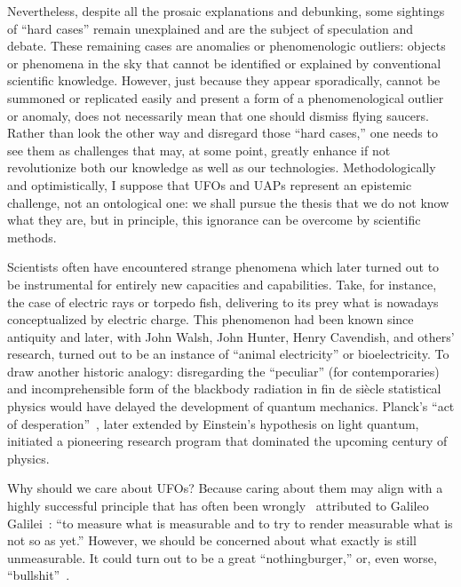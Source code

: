 Nevertheless, despite all the prosaic explanations and debunking, some sightings of ``hard cases''
remain unexplained and are the subject of speculation and debate.
These remaining cases are anomalies or phenomenologic outliers:
objects or phenomena in the sky that cannot be identified or explained by conventional scientific knowledge.
However,
just because they appear sporadically,
cannot be summoned or replicated easily and present a form of a phenomenological outlier or anomaly,
does not necessarily mean that one should dismiss flying saucers.
Rather than look the other way and disregard those ``hard cases,'' one needs to see them as challenges that may,
at some point, greatly enhance if not revolutionize both our knowledge as well as our technologies.
Methodologically and optimistically, I suppose that UFOs and UAPs represent an epistemic challenge,
not an ontological one: we shall pursue the thesis that we do not know what they are,
but in principle, this ignorance can be overcome by scientific methods.


Scientists often have encountered strange phenomena which later turned out to be instrumental
for entirely new capacities and capabilities.
Take, for instance, the case of electric rays or torpedo fish,
delivering to its prey what is nowadays conceptualized by electric charge.
This phenomenon had been known since antiquity and later, with John Walsh, John Hunter, Henry Cavendish, and others' research,
turned out to be an instance of ``animal electricity'' or bioelectricity.
To draw another historic analogy: disregarding the ``peculiar'' (for contemporaries) and incomprehensible form of the blackbody
radiation in fin de si\`ecle statistical physics would have delayed the development of quantum mechanics.
Planck's ``act of desperation''~\cite[p.~23]{Hermann1974Nov}, later extended by Einstein's hypothesis on light quantum,
initiated a pioneering research program that dominated the upcoming century of physics.


Why should we care about UFOs?
Because caring about them may align
with a highly successful principle that has often been wrongly~\cite{Kleinert_2009} attributed to Galileo Galilei~\cite[p.~139]{weyl:49}:
``to measure what is measurable and to try to render  measurable what is not so as yet.''
However, we should be concerned about what  exactly  is still unmeasurable.
It could turn out to be a great ``nothingburger,'' or, even worse,  ``bullshit''~\cite{Frankfurt-OnBullshit}.

